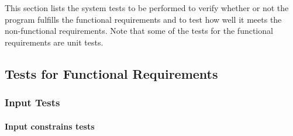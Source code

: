 \documentclass[12pt, titlepage]{article}
\begin{document}
This section lists the system tests to be performed to verify whether or not the
program fulfills the functional requirements and to test how well it meets the
non-functional requirements. Note that some of the tests for the functional
requirements are unit tests.

\subsection{Tests for Functional Requirements}

\subsubsection{Input Tests}

\paragraph{Input constrains tests}
\end{document}
